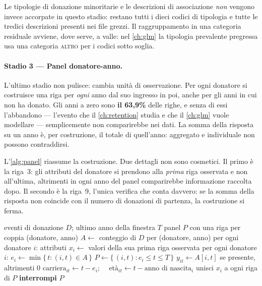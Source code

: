 Le tipologie di donazione minoritarie e le descrizioni di associazione
\emph{non} vengono invece accorpate in questo stadio: restano tutti i dieci
codici di tipologia e tutte le tredici descrizioni presenti nei file grezzi. Il
raggruppamento in una categoria residuale avviene, dove serve, a valle: nel
\cref{ch:glm} la tipologia prevalente pregressa usa una categoria
\textsc{altro} per i codici sotto soglia.

\paragraph{Stadio 3 --- Panel donatore-anno.}
L'ultimo stadio non pulisce: cambia unità di osservazione. Per ogni donatore si
costruisce una riga per \emph{ogni} anno dal suo ingresso in poi, anche per gli
anni in cui non ha donato. Gli anni a zero sono \textbf{il 63{,}9\%} delle
righe, e senza di essi l'abbandono --- l'evento che il \cref{ch:retention}
studia e che il \cref{ch:glm} vuole modellare --- semplicemente non
comparirebbe nei dati. La somma della risposta su un anno è, per costruzione,
il totale di quell'anno: aggregato e individuale non possono contraddirsi.

L'\cref{alg:panel} riassume la costruzione. Due dettagli non sono cosmetici. Il
primo è la riga~3: gli attributi del donatore si prendono alla \emph{prima}
riga osservata e non all'ultima, altrimenti in ogni anno del panel comparirebbe
informazione raccolta dopo. Il secondo è la riga~9, l'unica verifica che conta
davvero: se la somma della risposta non coincide con il numero di donazioni di
partenza, la costruzione si ferma.

\begin{algorithm}[H]
\caption{Costruzione del panel donatore-anno}
\label{alg:panel}
\begin{algorithmic}[1]
\Require eventi di donazione $D$; ultimo anno della finestra $T$
\Ensure panel $P$ con una riga per coppia (donatore, anno)
\State $A \gets$ conteggio di $D$ per (donatore, anno)
\State per ogni donatore $i$: attributi $x_i \gets$ valori della sua prima riga
osservata 
\State per ogni donatore $i$: $e_i \gets \min\{\,t : (i,t) \in A\,\}$
\State $P \gets \{\,(i, t) : e_i \le t \le T\,\}$
\State $y_{it} \gets A[i,t]$ se presente, altrimenti $0$
\State $\text{carriera}_{it} \gets t - e_i$; \ \ $\text{età}_{it} \gets t -
\text{anno di nascita}_i$
\State unisci $x_i$ a ogni riga di $P$
 \State \textbf{interrompi}
\EndIf
\State \Return $P$
\end{algorithmic}
\end{algorithm}

